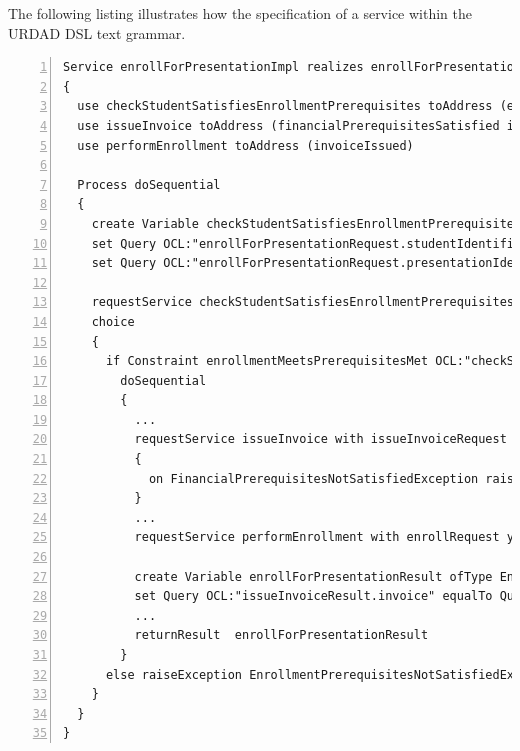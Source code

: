 The following listing illustrates how the specification of a service within the URDAD DSL text grammar.
\lstset{language=urdad,caption=Specifying a service in the textual URDAD DSL syntax.,label=serviceTextSyntax}
\begin{lstlisting}[numbers=left,escapechar=|]
Service enrollForPresentationImpl realizes enrollForPresentation receiving Variable enrollForPresentationRequest ofType EnrollForPresentationRequest
{
  use checkStudentSatisfiesEnrollmentPrerequisites toAddress (enrollmentPrerequisitesMet)
  use issueInvoice toAddress (financialPrerequisitesSatisfied invoiceIssued) 
  use performEnrollment toAddress (invoiceIssued)
   
  Process doSequential
  {
    create Variable checkStudentSatisfiesEnrollmentPrerequisitesRequest ofType CheckStudentSatisfiesEnrollmentPrerequisitesRequest               
    set Query OCL:"enrollForPresentationRequest.studentIdentifier" equalTo Query OCL:"checkEnrollmentPrerequisitesRequest.studentIdentifier"
    set Query OCL:"enrollForPresentationRequest.presentationIdentifier" equalTo Query OCL:"checkEnrollmentPrerequisitesRequest.presentationIdentifier"
                     
    requestService checkStudentSatisfiesEnrollmentPrerequisites with checkStudentSatisfiesEnrollmentPrerequisitesRequest yielding Variable checkStudentSatisfiesEnrollmentPrerequisitesResult ofType CheckStudentSatisfiesEnrollmentPrerequisitesResult
    choice
    {
      if Constraint enrollmentMeetsPrerequisitesMet OCL:"checkStudentSatisfiesEnrollmentPrerequisitesResult.enrollmentPrerequisitesMet = true"
        doSequential
        {
          ...
          requestService issueInvoice with issueInvoiceRequest yielding Variable issueInvoiceResult ofType IssueInvoiceResult
          {
            on FinancialPrerequisitesNotSatisfiedException raiseException FinancialPrerequisitesNotSatisfiedException
          }
	      ...
          requestService performEnrollment with enrollRequest yielding Variable performEnrollmentResult ofType PerformEnrollmentResult
          
          create Variable enrollForPresentationResult ofType EnrollForPresentationResult
          set Query OCL:"issueInvoiceResult.invoice" equalTo Query OCL:"enrollForPresentationResult.invoice"
          ...                       
          returnResult  enrollForPresentationResult
        }
      else raiseException EnrollmentPrerequisitesNotSatisfiedException
    }
  }
}                 
\end{lstlisting}

